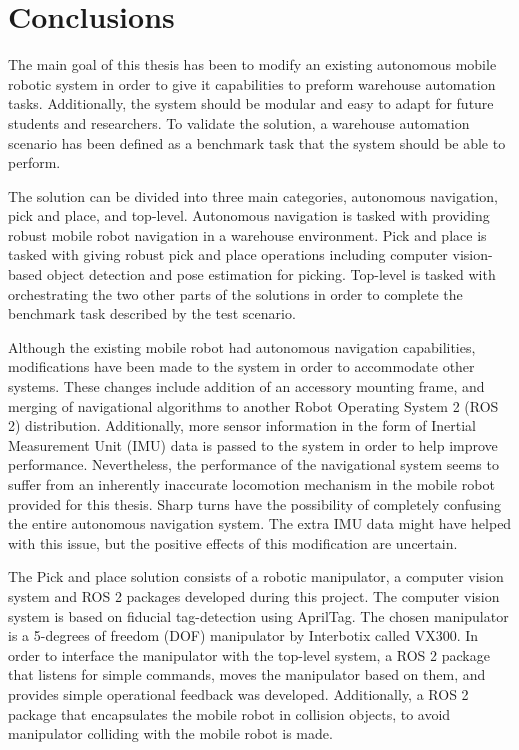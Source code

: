 \chapter{Conclusions}
The main goal of this thesis has been to modify an existing autonomous mobile robotic system in order to give it capabilities to preform warehouse automation tasks. Additionally, the system should be modular and easy to adapt for future students and researchers. To validate the solution, a warehouse automation scenario has been defined as a benchmark task that the system should be able to perform. 

The solution can be divided into three main categories, autonomous navigation, pick and place, and top-level. Autonomous navigation is tasked with providing robust mobile robot navigation in a warehouse environment. Pick and place is tasked with giving robust pick and place operations including computer vision-based object detection and pose estimation for picking. Top-level is tasked with orchestrating the two other parts of the solutions in order to complete the benchmark task described by the test scenario.

Although the existing mobile robot had autonomous navigation capabilities, modifications have been made to the system in order to accommodate other systems. These changes include addition of an accessory mounting frame, and merging of navigational algorithms to another Robot Operating System 2 (ROS 2) distribution. Additionally, more sensor information in the form of Inertial Measurement Unit (IMU) data is passed to the system in order to help improve performance. Nevertheless, the performance of the navigational system seems to suffer from an inherently inaccurate locomotion mechanism in the mobile robot provided for this thesis. Sharp turns have the possibility of completely confusing the entire autonomous navigation system. The extra IMU data might have helped with this issue, but the positive effects of this modification are uncertain.

The Pick and place solution consists of a robotic manipulator, a computer vision system and ROS 2 packages developed during this project. The computer vision system is based on fiducial tag-detection using AprilTag. The chosen manipulator is a 5-degrees of freedom (DOF) manipulator by Interbotix called VX300. In order to interface the manipulator with the top-level system, a ROS 2 package that listens for simple commands, moves the manipulator based on them, and provides simple operational feedback was developed. Additionally, a ROS 2 package that encapsulates the mobile robot in collision objects, to avoid manipulator colliding with the mobile robot is made.

